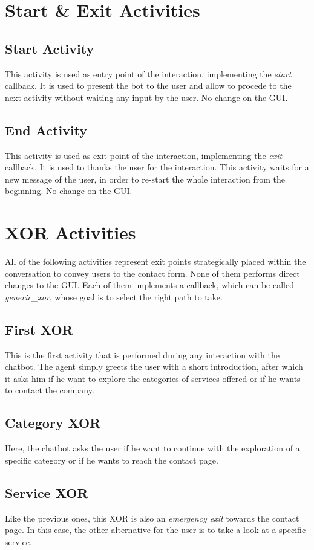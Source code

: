 \documentclass[12pt]{report}
\begin{document}
\section{Start \& Exit Activities}
\subsection{Start Activity}
This activity is used as entry point of the interaction, implementing the 
\emph{start} callback. It is used to present the bot to the user and allow to
procede to the next activity without waiting any input by the user. 
No change on the GUI.
\subsection{End Activity}
This activity is used as exit point of the interaction, implementing the 
\emph{exit} callback. It is used to thanks the user for the interaction. 
This activity waits for a new message of the user, in order to re-start the whole 
interaction from the beginning. No change on the GUI.
\section{XOR Activities}
All of the following activities represent exit points strategically placed
within the conversation to convey users to the contact form.
None of them performs direct changes to the GUI. Each of them implements a callback,
which can be called \emph{generic\_xor}, whose goal is to select the right path to take.

\subsection{First XOR}
This is the first activity that is performed during any interaction with
the chatbot. The agent simply greets the user with a short introduction,
after which it asks him if he want to explore the categories of services
offered or if he wants to contact the company.

\subsection{Category XOR}
Here, the chatbot asks the user if he want to continue with the exploration 
of a specific category or if he wants to reach the contact page.

\subsection{Service XOR}
Like the previous ones, this XOR is also an \emph{emergency exit} towards 
the contact page. In this case, the other alternative for the user is to 
take a look at a specific service.
\end{document}
